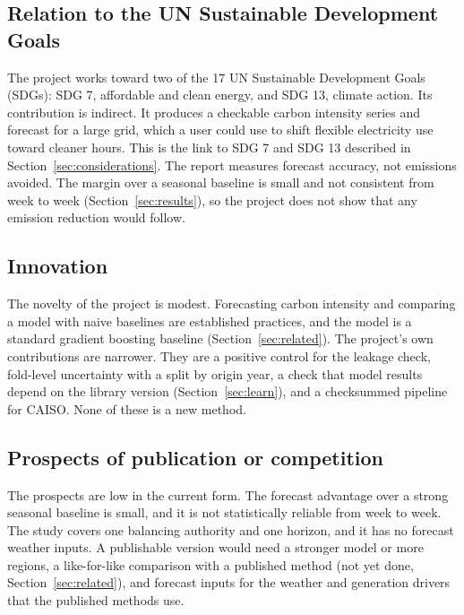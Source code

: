\documentclass[10pt,journal,compsoc]{IEEEtran}
\begin{document}
\subsection{Relation to the UN Sustainable Development Goals}
The project works toward two of the 17 UN Sustainable Development Goals (SDGs): SDG 7, affordable and clean energy, and SDG 13, climate action. Its contribution is indirect. It produces a checkable carbon intensity series and forecast for a large grid, which a user could use to shift flexible electricity use toward cleaner hours. This is the link to SDG 7 and SDG 13 described in Section~\ref{sec:considerations}. The report measures forecast accuracy, not emissions avoided. The margin over a seasonal baseline is small and not consistent from week to week (Section~\ref{sec:results}), so the project does not show that any emission reduction would follow.

\subsection{Innovation}
The novelty of the project is modest. Forecasting carbon intensity and comparing a model with naive baselines are established practices, and the model is a standard gradient boosting baseline (Section~\ref{sec:related}). The project's own contributions are narrower. They are a positive control for the leakage check, fold-level uncertainty with a split by origin year, a check that model results depend on the library version (Section~\ref{sec:learn}), and a checksummed pipeline for CAISO. None of these is a new method.

\subsection{Prospects of publication or competition}
The prospects are low in the current form. The forecast advantage over a strong seasonal baseline is small, and it is not statistically reliable from week to week. The study covers one balancing authority and one horizon, and it has no forecast weather inputs. A publishable version would need a stronger model or more regions, a like-for-like comparison with a published method (not yet done, Section~\ref{sec:related}), and forecast inputs for the weather and generation drivers that the published methods use.
\end{document}
